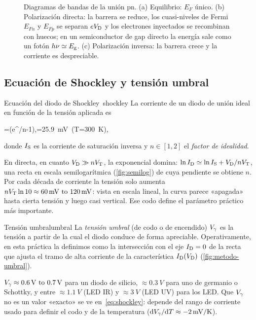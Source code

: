 \documentclass[11pt,a4paper]{article}
\begin{document}
\begin{figure}[htbp]
  \centering
  
  \caption{Diagramas de bandas de la unión pn. (a) Equilibrio: $E_F$ único.
  (b) Polarización directa: la barrera se reduce, los cuasi-niveles de Fermi
  $E_{Fn}$ y $E_{Fp}$ se separan $eV_{\mathrm D}$ y los electrones inyectados se
  recombinan con huecos; en un semiconductor de gap directo la energía sale
  como un fotón $h\nu\simeq E_{\mathrm g}$. (c) Polarización inversa: la barrera crece y
  la corriente es despreciable.}
  \label{fig:bandas}
\end{figure}

\subsection{Ecuación de Shockley y tensión umbral}

\begin{proposicion}{Ecuación del diodo de Shockley~\cite{shockley}}{shockley}
  La corriente de un diodo de unión ideal en función de la tensión aplicada es
  \begin{destacada}
    \ID=\IS\left(e^{\VD/n\VT}-1\right),\qquad \VT=\simeq\SI{25.9}{mV}\ (T=\SI{300}{K}),
    \label{eq:shockley}
  \end{destacada}
  donde $I_{\mathrm S}$ es la corriente de saturación inversa y $n\in[1,2]$ el
  \emph{factor de idealidad}.
\end{proposicion}

En directa, en cuanto $V_{\mathrm D}\gg nV_{\mathrm T}$, la exponencial domina:
$\ln I_{\mathrm D}\simeq\ln I_{\mathrm S}+V_{\mathrm D}/nV_{\mathrm T}$, una recta en escala semilogarítmica
(\cref{fig:semilog}) de cuya pendiente se obtiene $n$. Por cada década de
corriente la tensión solo aumenta $n\VT\ln10\approx\SIrange{60}{120}{mV}$:
vista en escala lineal, la curva parece «apagada» hasta cierta tensión y
luego casi vertical. Ese codo define el parámetro práctico más importante.

\begin{definicion}{Tensión umbral}{umbral}
  La \emph{tensión umbral} (de codo o de encendido) $V_{\gamma}$ es la tensión a
  partir de la cual el diodo conduce de forma apreciable. Operativamente, en
  esta práctica la definimos como la intersección con el eje $I_{\mathrm D}=0$ de la
  recta que ajusta el tramo de alta corriente de la característica
  $I_{\mathrm D}(V_{\mathrm D})$ (\cref{fig:metodo-umbral}).
\end{definicion}

\begin{observacion}
  $\Vg\approx\SIrange{0.6}{0.7}{V}$ para un diodo de silicio,
  $\approx\SI{0.3}{V}$ para uno de germanio o Schottky, y entre
  $\approx\SI{1.1}{V}$ (LED IR) y $\approx\SI{3}{V}$ (LED UV) para los LED. Que
  $V_{\gamma}$ no es un valor «exacto» se ve en~\eqref{eq:shockley}: depende del rango
  de corriente usado para definir el codo y de la temperatura
  ($\mathrm dV_{\gamma}/\mathrm dT\approx\SI{-2}{mV/K}$).
\end{observacion}
\end{document}
